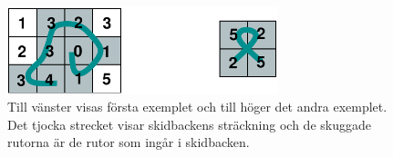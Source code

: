 \begin{figure}[h]
  \centering
      \includegraphics[width=0.7\textwidth]{planetbackefig2}
      \caption{Till vänster visas första exemplet och till höger det andra exemplet. Det tjocka strecket visar skidbackens sträckning och de skuggade rutorna är de rutor som ingår i skidbacken.}
\end{figure}
